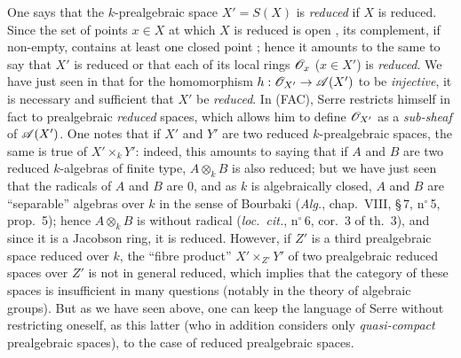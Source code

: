 \begin{env}[10.10.4]
\label{IV.10.10.4}
One says that the $k$-prealgebraic space $X'=S(X)$ is \emph{reduced} if $X$ is reduced. Since the set of points $x\in X$ at which $X$ is reduced is open , its complement, if non-empty, contains at least one closed point ; hence it amounts to the same to say that $X'$ is reduced or that each of its local rings $\mathscr{O}_x$ ($x\in X'$) is \emph{reduced}. We have just seen in  that for the homomorphism $h:\mathscr{O}_{X'}\to\mathscr{A}(X')$ to be \emph{injective}, it is necessary and sufficient that $X'$ be \emph{reduced}.
In (FAC), Serre restricts himself in fact to prealgebraic \emph{reduced} spaces, which allows him to define $\mathscr{O}_{X'}$ as a \emph{sub-sheaf} of $\mathscr{A}(X')$.
One notes that if $X'$ and $Y'$ are two reduced $k$-prealgebraic spaces, the same is true of $X'\times_k Y'$: indeed, this amounts to saying that if $A$ and $B$ are two reduced $k$-algebras of finite type, $A\otimes_k B$ is also reduced; but we have just seen that the radicals of $A$ and $B$ are $0$, and as $k$ is algebraically closed, $A$ and $B$ are ``separable'' algebras over $k$ in the sense of Bourbaki (\emph{Alg.}, chap.~VIII, \S\,7, n$^\circ$\,5, prop.~5); hence $A\otimes_k B$ is without radical (\emph{loc.\ cit.}, n$^\circ$\,6, cor.~3 of th.~3), and since it is a Jacobson ring, it is reduced.
However, if $Z'$ is a third prealgebraic space reduced over $k$, the ``fibre product'' $X'\times_{Z'}Y'$ of two prealgebraic reduced spaces over $Z'$ is not in general reduced, which implies that the category of these spaces is insufficient in many questions (notably in the theory of algebraic groups).
But as we have seen above, one can keep the language of Serre without restricting oneself, as this latter (who in addition considers only \emph{quasi-compact} prealgebraic spaces), to the case of reduced prealgebraic spaces.
\end{env}


